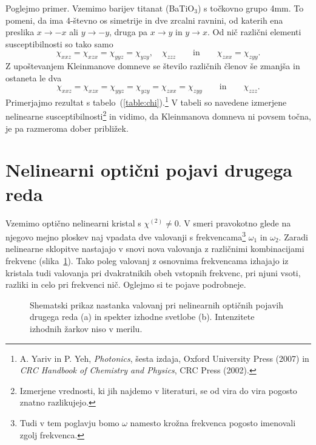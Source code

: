 Poglejmo primer. 
Vzemimo barijev titanat (BaTiO$_3$) s točkovno grupo 4mm. To pomeni, da
ima 4-števno os simetrije in dve zrcalni ravnini, od katerih ena preslika $x \to -x$ ali $y \to -y$, 
druga pa $x\to y$ in $y\to x$. Od nič različni elementi susceptibilnosti so tako samo
\begin{equation}
\chi_{xxz} = \chi_{xzx} =   \chi_{yyz} = \chi_{yzy}, \quad  \chi_{zzz} \qquad \mathrm{in} 
\qquad \chi_{zxx} = \chi_{zyy}.   
\end{equation}
Z upoštevanjem Kleinmanove domneve se število različnih členov še zmanjša in ostaneta le dva
\begin{equation}
\chi_{xxz} = \chi_{xzx} = \chi_{yyz} = \chi_{yzy} =\chi_{zxx} = \chi_{zyy} \qquad \mathrm{in} \qquad \chi_{zzz}.   
\end{equation}
Primerjajmo rezultat s tabelo~(\ref{table:chi}).\footnote{A. Yariv in 
P. Yeh, {\it Photonics}, šesta izdaja, Oxford University Press (2007) in
{\it CRC Handbook of Chemistry and Physics}, CRC Press (2002).} V tabeli
so navedene izmerjene nelinearne susceptibilnosti\footnote{Izmerjene vrednosti, 
ki jih najdemo v literaturi, se od vira do vira pogosto znatno razlikujejo.} in vidimo, da Kleinmanova
domneva ni povsem točna, je pa razmeroma dober približek. 

\section{Nelinearni optični pojavi drugega reda}
Vzemimo optično nelinearni kristal s $\chi^{(2)} \neq 0$. V smeri pravokotno 
glede na njegovo mejno ploskev naj vpadata dve valovanji s frekvencama\footnote{Tudi 
v tem poglavju bomo $\omega$ namesto krožna frekvenca pogosto imenovali zgolj frekvenca.}
$\omega_{1}$ in $\omega_{2}$. Zaradi nelinearne sklopitve nastajajo v snovi nova 
valovanja z različnimi kombinacijami frekvenc (slika~\ref{fig:nl2}).
Tako poleg valovanj z osnovnima frekvencama izhajajo iz kristala tudi 
valovanja pri dvakratnikih obeh vstopnih frekvenc, pri njuni vsoti, 
razliki in celo pri frekvenci nič. Oglejmo si te pojave podrobneje.
\begin{figure}[h]
\centering
\def\svgwidth{140truemm} 

\caption{Shematski prikaz nastanka valovanj pri nelinearnih optičnih pojavih drugega reda (a)
in spekter izhodne svetlobe (b). Intenzitete izhodnih žarkov niso v merilu.}
\label{fig:nl2}
\end{figure}

